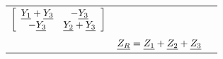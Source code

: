 \documentclass{article}
\begin{document}
\begin{twocolumn}
\begin{tabular}{ccc}
  $\displaystyle \left[ \begin{array}{cc}
    \underline{Y_1} + \underline{Y_3} & -\underline{Y_3} \\ -\underline{Y_3} & \underline{Y_2} + \underline{Y_3}
  \end{array} \right] $ \\
  
  & $\underline{Z_R} = \underline{Z_1} + \underline{Z_2} + \underline{Z_3}$ & \\
  
  \midrule
  
  
\end{tabular}

% 
% 
% 

\end{twocolumn}
\end{document}
